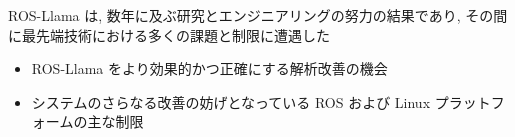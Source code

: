 \begin{frame}{}
    ROS-Llama は, 数年に及ぶ研究とエンジニアリングの努力の結果であり, その間に最先端技術における多くの課題と制限に遭遇した

    \begin{itemize}
        \item  ROS-Llama をより効果的かつ正確にする解析改善の機会

        \item  システムのさらなる改善の妨げとなっている ROS および Linux プラットフォームの主な制限
    \end{itemize}
\end{frame}

